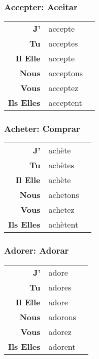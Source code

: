 \documentclass{subfiles}
\begin{document}
    \begin{multicols*}{3}
        \subsubsection{Accepter: Aceitar}
            \begin{tabular}{r l r}
                \textbf{J'}        & accepte   &\\
                \textbf{Tu}        & acceptes  &\\
                \textbf{Il Elle}   & accepte   &\\
                \textbf{Nous}      & acceptons &\\
                \textbf{Vous}      & acceptez  &\\
                \textbf{Ils Elles} & acceptent &
            \end{tabular}
        
        \subsubsection{Acheter: Comprar}
            \begin{tabular}{r l r}
                \textbf{J'}        & achète   &\\
                \textbf{Tu}        & achètes  &\\
                \textbf{Il Elle}   & achète   &\\
                \textbf{Nous}      & achetons &\\
                \textbf{Vous}      & achetez  &\\
                \textbf{Ils Elles} & achètent &
            \end{tabular}

        \subsubsection{Adorer: Adorar}
            \begin{tabular}{r l r}
                \textbf{J'}        & adore   &\\
                \textbf{Tu}        & adores  &\\
                \textbf{Il Elle}   & adore   &\\
                \textbf{Nous}      & adorons &\\
                \textbf{Vous}      & adorez  &\\
                \textbf{Ils Elles} & adorent &
            \end{tabular}


\end{multicols*}
\end{document}
